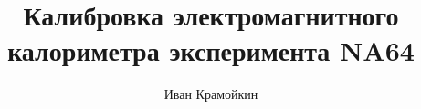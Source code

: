 \documentclass[a4paper,14pt]{article}
\author{Иван Крамойкин}
\title{Калибровка электромагнитного калориметра эксперимента NA64}
\begin{document}
\def\figurename{Рисунок}

\maketitle

\newpage






 
\end{document}
